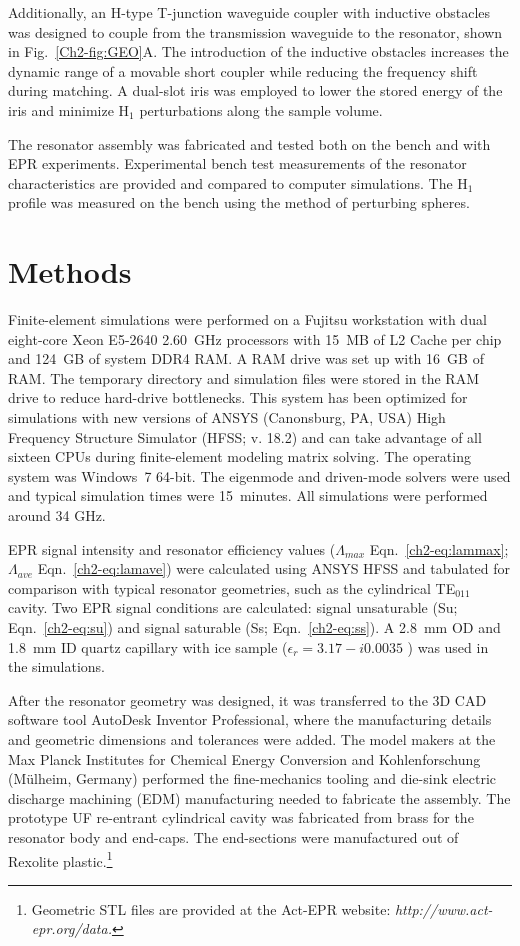 Additionally, an H-type T-junction waveguide coupler with inductive obstacles was designed to couple from the transmission waveguide to the resonator, shown in Fig.~\ref{Ch2-fig:GEO}A. The introduction of the inductive obstacles increases the dynamic range of a movable short coupler while reducing the frequency shift during matching. A dual-slot iris was employed to lower the stored energy of the iris and minimize H$_1$ perturbations along the sample volume. \cite{UFLGR2017}

The resonator assembly was fabricated and tested both on the bench and with EPR experiments. Experimental bench test measurements of the resonator characteristics are provided and compared to computer simulations. The H$_1$ profile was measured on the bench using the method of perturbing spheres. 

\section{Methods}
Finite-element simulations were performed on a Fujitsu workstation with dual eight-core Xeon E5-2640 2.60~GHz processors with 15~MB of L2 Cache per chip and 124~GB of system DDR4 RAM. A RAM drive was set up with 16~GB of RAM. The temporary directory and simulation files were stored in the RAM drive to reduce hard-drive bottlenecks. This system has been optimized for simulations with new versions of ANSYS (Canonsburg, PA, USA) High Frequency Structure Simulator (HFSS; v. 18.2) and can take advantage of all sixteen CPUs during finite-element modeling matrix solving. The operating system was Windows~7 64-bit. The eigenmode and driven-mode solvers were used and typical simulation times were 15~minutes. All simulations were performed around 34 GHz.

EPR signal intensity and resonator efficiency values ($\Lambda_{max}$ Eqn.~\ref{ch2-eq:lammax}; $\Lambda_{ave}$ Eqn.~\ref{ch2-eq:lamave}) were calculated using ANSYS HFSS \cite{misrabook} and tabulated for comparison with typical resonator geometries, such as the cylindrical TE$_{011}$ cavity. \cite{generalte011} Two EPR signal conditions are calculated: signal unsaturable (Su; Eqn.~\ref{ch2-eq:su}) and signal saturable (Ss; Eqn.~\ref{ch2-eq:ss}). A 2.8~mm OD and 1.8~mm ID quartz capillary with ice sample ($\epsilon_r=3.17-i0.0035$ \cite{icedielectric} ) was used in the simulations.

After the resonator geometry was designed, it was transferred to the 3D CAD software tool AutoDesk Inventor Professional, where the manufacturing details and geometric dimensions and tolerances were added. The model makers at the Max Planck Institutes for Chemical Energy Conversion and Kohlenforschung (M\"ulheim, Germany) performed the fine-mechanics tooling and die-sink electric discharge machining (EDM) manufacturing needed to fabricate the assembly. The prototype UF re-entrant cylindrical \cylTE{} cavity was fabricated from brass for the resonator body and end-caps. The end-sections were manufactured out of Rexolite plastic.\footnote{Geometric STL files are provided at the Act-EPR website: \textit{http://www.act-epr.org/data.}}

